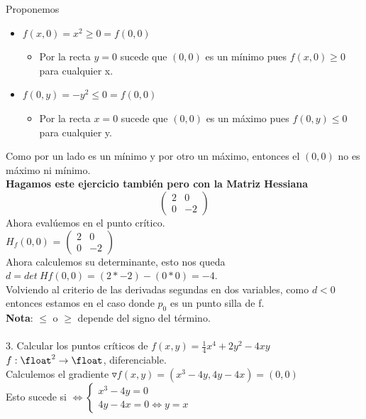 \documentclass[10pt,a4paper]{article}
\begin{document}
Proponemos 
\begin{itemize}
    \item $f(x,0) = x^{2} \ge 0 = f(0,0)$
    \begin{itemize}
        \item Por la recta $y=0$ sucede que $(0,0)$ es un mínimo pues $f(x,0) \ge 0$ para cualquier x.
    \end{itemize}
    \item $f(0, y) = -y^{2} \le 0 = f(0,0)$
    \begin{itemize}
        \item Por la recta $x=0$ sucede que $(0,0)$ es un máximo pues $f(0, y) \le 0$ para cualquier y.
    \end{itemize}
\end{itemize}
Como por un lado es un mínimo y por otro un máximo, entonces el $(0,0)$ no es máximo ni mínimo. \\
\textbf{Hagamos este ejercicio también pero con la Matriz Hessiana} \\
\[
\begin{pmatrix}
2 & 0 \\
0 & -2
\end{pmatrix}
\]
Ahora evalúemos en el punto crítico. \\
$H_{f}(0,0)$ = \(
\begin{pmatrix}
2 & 0 \\
0 & -2
\end{pmatrix}
\) \\
Ahora calculemos su determinante, esto nos queda $d = det \ Hf(0,0) = (2 * -2) - (0 * 0) = -4 $. \\
Volviendo al criterio de las derivadas segundas en dos variables, como $d < 0 $ entonces estamos en el caso donde $p_{0}$ es un punto silla de f. \\
\textbf{Nota}: $\le$ o $\ge$ depende del signo del término. \\ \\ 
3. Calcular los puntos críticos de $f(x,y) = \frac{1}{4}x^{4} + 2y^{2} - 4xy$ \\
$f:\float^{2} \rightarrow \float$, diferenciable. \\
Calculemos el gradiente $\triangledown f(x,y) = (x^{3}-4y, 4y-4x) = (0,0)$ \\
Esto sucede si 
\( \iff
\begin{cases} 
    x^{3} - 4y = 0 \\
    4y - 4x = 0 \iff y = x
\end{cases}
\) \\
\end{document}
